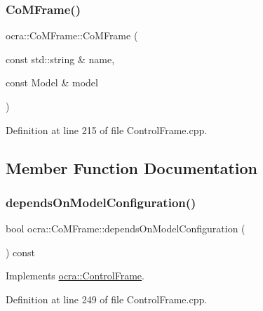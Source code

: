 \subsubsection{\texorpdfstring{Co\+M\+Frame()}{CoMFrame()}}
{\footnotesize\ttfamily ocra\+::\+Co\+M\+Frame\+::\+Co\+M\+Frame (\begin{DoxyParamCaption}\item[{const std\+::string \&}]{name,  }\item[{const Model \&}]{model }\end{DoxyParamCaption})}



Definition at line 215 of file Control\+Frame.\+cpp.



\subsection{Member Function Documentation}
\hypertarget{classocra_1_1CoMFrame_aaae3fd05da2f9e301dbe1c54b57fe624}{}\label{classocra_1_1CoMFrame_aaae3fd05da2f9e301dbe1c54b57fe624} 
\subsubsection{\texorpdfstring{depends\+On\+Model\+Configuration()}{dependsOnModelConfiguration()}}
{\footnotesize\ttfamily bool ocra\+::\+Co\+M\+Frame\+::depends\+On\+Model\+Configuration (\begin{DoxyParamCaption}{ }\end{DoxyParamCaption}) const\hspace{0.3cm}{\ttfamily [virtual]}}



Implements \hyperlink{classocra_1_1ControlFrame_a65833d1f3f42bc8d452f8b1fb671e142}{ocra\+::\+Control\+Frame}.



Definition at line 249 of file Control\+Frame.\+cpp.

\hypertarget{classocra_1_1CoMFrame_a9e59ca65720c553da5c75f484544829c}{}\label{classocra_1_1CoMFrame_a9e59ca65720c553da5c75f484544829c} 
